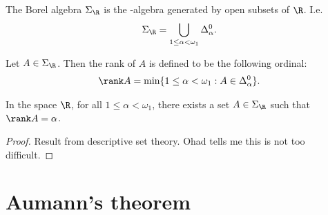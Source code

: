\documentclass{article}
\begin{document}
\begin{definition}
	The Borel algebra $\Sigma_\R$ is the \sigma-algebra generated by open subsets of $\R$. I.e. 
	\begin{align*}
		\Sigma_\R = \bigcup_{1\leq\alpha<\omega_1}\Delta_\alpha^0.
	\end{align*}
\end{definition}

\begin{definition}[Rank]
	Let $A\in\Sigma_\R$. Then the rank of $A$ is defined to be the following ordinal:
	\begin{align*}
		\rank A = \min\{1\leq\alpha<\omega_1:A\in\Delta_\alpha^0\}.	
	\end{align*}
\end{definition}

\begin{proposition}
	\label{borelcap}
	In the space $\R$, for all $1\leq\alpha<\omega_1$, there exists a set $A\in\Sigma_\R$
	such that $\rank A=\alpha$.
	\begin{proof}
		Result from descriptive set theory. Ohad tells me this is not too difficult.
	\end{proof}
\end{proposition}

\section{Aumann's theorem}
\end{document}
